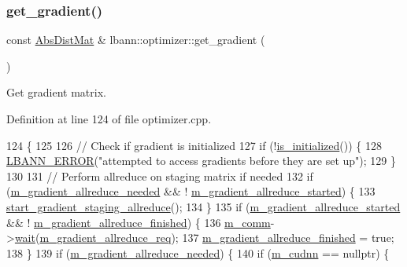 \subsubsection{\texorpdfstring{get\+\_\+gradient()}{get\_gradient()}}
{\footnotesize\ttfamily const \hyperlink{base_8hpp_a9a697a504ae84010e7439ffec862b470}{Abs\+Dist\+Mat} \& lbann\+::optimizer\+::get\+\_\+gradient (\begin{DoxyParamCaption}{ }\end{DoxyParamCaption})}

Get gradient matrix. 

Definition at line 124 of file optimizer.\+cpp.


\begin{DoxyCode}
124                                           \{
125 
126   \textcolor{comment}{// Check if gradient is initialized}
127   \textcolor{keywordflow}{if} (!\hyperlink{classlbann_1_1optimizer_abccf0babf69e3d7c6e9a7fd0731c79b7}{is\_initialized}()) \{
128     \hyperlink{base_8hpp_a80b1d707117e968a6951b7222e4b2b87}{LBANN\_ERROR}(\textcolor{stringliteral}{"attempted to access gradients before they are set up"});
129   \}
130 
131   \textcolor{comment}{// Perform allreduce on staging matrix if needed}
132   \textcolor{keywordflow}{if} (\hyperlink{classlbann_1_1optimizer_a2dc18dcc3cf9510947304c3c5d059eb0}{m\_gradient\_allreduce\_needed} && !
      \hyperlink{classlbann_1_1optimizer_ac77740a916f397600efae0c03bc5a045}{m\_gradient\_allreduce\_started}) \{
133     \hyperlink{classlbann_1_1optimizer_a1fe495ccbd62d50735615818abecf454}{start\_gradient\_staging\_allreduce}();
134   \}
135   \textcolor{keywordflow}{if} (\hyperlink{classlbann_1_1optimizer_ac77740a916f397600efae0c03bc5a045}{m\_gradient\_allreduce\_started} && !
      \hyperlink{classlbann_1_1optimizer_a4d332551d05e245ad3f862653b5af65a}{m\_gradient\_allreduce\_finished}) \{
136     \hyperlink{classlbann_1_1optimizer_a8c2569a8fcf0ee969517067b81896c44}{m\_comm}->\hyperlink{classlbann_1_1lbann__comm_a30439f28cf615e1406090799c5499321}{wait}(\hyperlink{classlbann_1_1optimizer_a851681b39c34a3439a9838c07e84b87c}{m\_gradient\_allreduce\_req});
137     \hyperlink{classlbann_1_1optimizer_a4d332551d05e245ad3f862653b5af65a}{m\_gradient\_allreduce\_finished} = \textcolor{keyword}{true};
138   \}
139   \textcolor{keywordflow}{if} (\hyperlink{classlbann_1_1optimizer_a2dc18dcc3cf9510947304c3c5d059eb0}{m\_gradient\_allreduce\_needed}) \{
140     \textcolor{keywordflow}{if} (\hyperlink{classlbann_1_1optimizer_a2f24dbeaca18b06f4aa7d179bbf96680}{m\_cudnn} == \textcolor{keyword}{nullptr}) \{

\end{DoxyCode}

